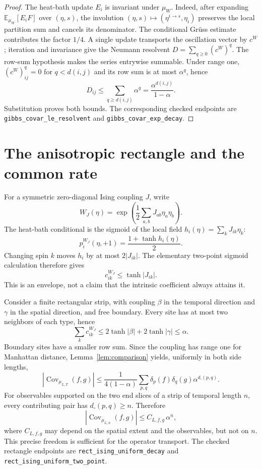 \documentclass[11pt]{article}
\theoremstyle{definition}
\theoremstyle{remark}
\newcommand{\Cov}{\operatorname{Cov}}
\newcommand{\lean}[1]{\nolinkurl{#1}}
\begin{document}
\begin{proof}
The heat-bath update $E_i$ is invariant under $\mu_W$.  Indeed, after
expanding $\mathbb E_{\mu_W}[E_iF]$ over $(\eta,s)$, the involution
$(\eta,s)\mapsto(\eta^{i\to s},\eta_i)$ preserves the local partition sum
and cancels its denominator.  The conditional Gr\"uss estimate contributes
the factor $1/4$.  A single update transports the oscillation vector by
$c^W$; iteration and invariance give the Neumann resolvent
$D=\sum_{q\geq0}(c^W)^q$.  The row-sum hypothesis makes the series
entrywise summable.  Under range one, $(c^W)^q_{ij}=0$ for
$q<d(i,j)$ and its row sum is at most $\alpha^q$, hence
\[
  D_{ij}\leq\sum_{q\geq d(i,j)}\alpha^q
  =\frac{\alpha^{d(i,j)}}{1-\alpha}.
\]
Substitution proves both bounds.  The corresponding checked endpoints are
\lean{gibbs\_covar\_le\_resolvent} and
\lean{gibbs\_covar\_exp\_decay}.
\end{proof}

\section{The anisotropic rectangle and the common rate}
\label{sec:rectangle}

For a symmetric zero-diagonal Ising coupling $J$, write
\[
  W_J(\eta)=\exp\!\left(\frac12\sum_{a,b}J_{ab}\eta_a\eta_b\right).
\]
The heat-bath conditional is the sigmoid of the local field
$h_i(\eta)=\sum_kJ_{ik}\eta_k$:
\[
  p_i^{W_J}(\eta,+1)=\frac{1+\tanh h_i(\eta)}2.
\]
Changing spin $k$ moves $h_i$ by at most $2|J_{ik}|$.  The elementary
two-point sigmoid calculation therefore gives
\[
  c^{W_J}_{ik}\leq\tanh|J_{ik}|.
\]
This is an envelope, not a claim that the intrinsic coefficient always
attains it.

Consider a finite rectangular strip, with coupling $\beta$ in the temporal
direction and $\gamma$ in the spatial direction, and free boundary.  Every
site has at most two neighbors of each type, hence
\[
  \sum_k c^{W_J}_{ik}
  \leq 2\tanh|\beta|+2\tanh|\gamma|
  \leq\alpha.
\]
Boundary sites have a smaller row sum.  Since the coupling has range one for
Manhattan distance, Lemma~\ref{lem:comparison} yields, uniformly in both side
lengths,
\[
  |\Cov_{\mu_{L,T}}(f,g)|
  \leq \frac{1}{4(1-\alpha)}
  \sum_{p,q}\delta_p(f)\delta_q(g)\alpha^{d_\square(p,q)}.
\]
For observables supported on the two end slices of a strip of temporal length
$n$, every contributing pair has $d_\square(p,q)\geq n$.  Therefore
\begin{equation}
\label{eq:end-slice-decay}
  |\Cov_{\mu_{L,n}}(f,g)|
  \leq C_{L,f,g}\,\alpha^n,
\end{equation}
where $C_{L,f,g}$ may depend on the spatial extent and the observables, but not
on $n$.  This precise freedom is sufficient for the operator transport.  The
checked rectangle endpoints are \lean{rect\_ising\_uniform\_decay} and
\lean{rect\_ising\_uniform\_two\_point}.
\end{document}
